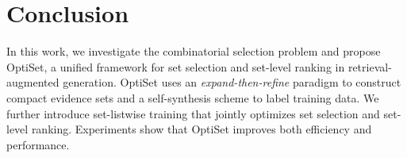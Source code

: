 \documentclass[11pt]{article}
\begin{document}


\section{Conclusion}
In this work, we investigate the combinatorial selection problem and propose OptiSet, 
a unified framework for set selection and set-level ranking in retrieval-augmented generation. OptiSet uses an \emph{expand-then-refine} paradigm to construct compact evidence sets and a self-synthesis scheme to label training data. We further introduce set-listwise training that jointly optimizes set selection and set-level ranking. Experiments show that OptiSet improves both efficiency and performance.
\end{document}
